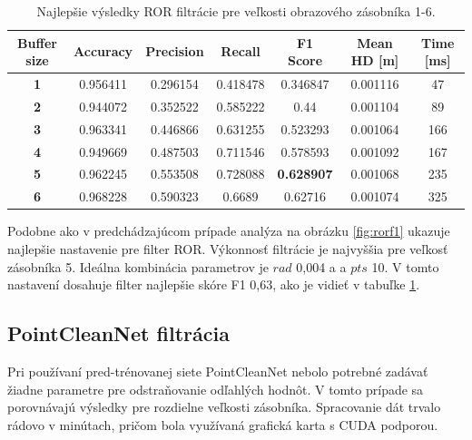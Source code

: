 \begin{table}[h]
	\centering
	\caption{\label{tab:ror_best} Najlepšie výsledky ROR filtrácie pre veľkosti obrazového zásobníka 1-6. }
	\begin{tabular}{ccccccc}
		\toprule
		\textbf{Buffer size} & \textbf{Accuracy} & \textbf{Precision} & \textbf{Recall} & \textbf{F1 Score} & \textbf{Mean HD [m]} & \textbf{Time [ms]} \\ 
		\midrule
		\textbf{1}           & 0.956411          & 0.296154           & 0.418478        & 0.346847          & 0.001116          & 47            \\ 
		\textbf{2}           & 0.944072          & 0.352522           & 0.585222        & 0.44              & 0.001104          & 89            \\ 
		\textbf{3}           & 0.963341          & 0.446866           & 0.631255        & 0.523293          & 0.001064          & 166           \\
		\textbf{4}           & 0.949669          & 0.487503           & 0.711546        & 0.578593          & 0.001092          & 167           \\ 
		\textbf{5}           & 0.962245          & 0.553508           & 0.728088        & \textbf{0.628907}          & 0.001068 & 235           \\ 
		\textbf{6}           & 0.968228          & 0.590323           & 0.6689          & 0.62716           & 0.001074          & 325           \\ 
		\bottomrule
	\end{tabular}
\end{table}

Podobne ako v predchádzajúcom prípade analýza na obrázku \ref{fig:rorf1} ukazuje najlepšie nastavenie pre filter ROR. Výkonnosť filtrácie je najvyššia pre veľkosť zásobníka 5. Ideálna kombinácia parametrov je $rad$ 0,004 a a $pts$ 10. V tomto nastavení dosahuje filter najlepšie skóre F1 0,63, ako je vidieť v tabuľke \ref{tab:ror_best}.

\subsection{PointCleanNet filtrácia}
Pri používaní pred-trénovanej siete PointCleanNet nebolo potrebné zadávať žiadne parametre pre odstraňovanie odľahlých hodnôt. V tomto prípade sa porovnávajú výsledky pre rozdielne veľkosti zásobníka. Spracovanie dát trvalo rádovo v minútach, pričom bola využívaná grafická karta s CUDA podporou.

